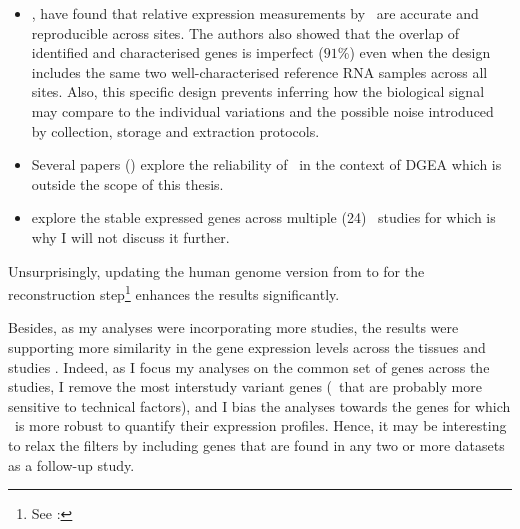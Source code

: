 \begin{itemize}[topsep=0pt,nosep]
subsets of \gtex\ and \tcga\ raw data that they have quantified \mRNAs\ at
transcript levels with  (hg19).
They have corrected for the study effect with 
and have released the normalised data to the community.
Note that \egxa\ provides more recent versions of the \gtex\ and \tcga\
(as a part of the \pcawg\ project\footnote{\pcawg\ project
analyses conjointly all available kind of research data related to cancer}) data.\mybr\
\item\hspace{-1mm}\fullcite{seqcmaqc}, have found that relative expression measurements
by \Rnaseq\ are accurate and reproducible across sites.
The authors also showed that the overlap of identified and characterised genes
is imperfect ($91$\%)
even when the design includes
the same two well-characterised reference RNA samples across all sites.
Also,
this specific design prevents inferring how the biological signal
may compare to the individual variations and the possible noise introduced
by collection, storage and extraction protocols.\mybr\
\item Several papers (\cite{Khang2015-qt,ruvseqComQN,Rau2014-va})
    explore the reliability of \Rnaseq\ in the context of
    \gls{DGEA} which is outside the scope of this thesis.\mybr\
\item\cite{Zhuo2016-qi} explore the stable expressed genes across multiple
    (24) \Rnaseq\ studies for \species{Arabidopsis}
    which is why I will not discuss it further.\mybr\
\end{itemize}

\vspace{2.5mm}
Unsurprisingly,
updating the human genome version from \hg{37} to 
for the reconstruction
step\footnote{See : }
enhances the results significantly.\mybr\

\vspace{2.5mm}
Besides, as my analyses were incorporating more studies,
the results were supporting more similarity in the gene expression levels across
the tissues and studies%
.
Indeed, as I focus my analyses on the common set of genes across the studies,
I remove the most interstudy variant genes
(\ie\ that are probably more sensitive to technical factors), and
I bias the analyses towards the genes
for which \Rnaseq\ is more robust to quantify their expression profiles.
Hence, it may be interesting to relax the filters by including genes
that are found in any two or more datasets as a follow-up study.\mybr\

